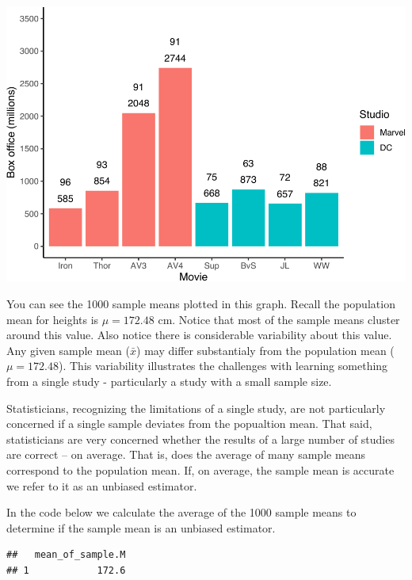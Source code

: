 \documentclass[
]{krantz}
\makeatletter
\newenvironment{Shaded}{\begin{snugshade}}{\end{snugshade}}
\newcommand{\DataTypeTok}[1]{\textcolor[rgb]{0.27,0.27,0.27}{#1}}
\newcommand{\KeywordTok}[1]{\textcolor[rgb]{0.27,0.27,0.27}{\textbf{#1}}}
\newcommand{\NormalTok}[1]{#1}
\newcommand{\OperatorTok}[1]{\textcolor[rgb]{0.43,0.43,0.43}{\textbf{#1}}}
\newcommand{\StringTok}[1]{\textcolor[rgb]{0.5,0.5,0.5}{#1}}
\newenvironment{kframe}{%
\medskip{}
\setlength{\fboxsep}{.8em}
 \def\at@end@of@kframe{}%
 \ifinner\ifhmode%
  \def\at@end@of@kframe{\end{minipage}}%
  \begin{minipage}{\columnwidth}%
 \fi\fi%
 \def\FrameCommand##1{\hskip\@totalleftmargin \hskip-\fboxsep
 \colorbox{shadecolor}{##1}\hskip-\fboxsep
     \hskip-\linewidth \hskip-\@totalleftmargin \hskip\columnwidth}%
 \MakeFramed {\advance\hsize-\width
   \@totalleftmargin\z@ \linewidth\hsize
   \@setminipage}}%
 {\par\unskip\endMakeFramed%
 \at@end@of@kframe}
\renewenvironment{Shaded}{\begin{kframe}}{\end{kframe}}
\makeatother
\begin{document}
\includegraphics{bookdown_files/figure-latex/unnamed-chunk-211-1.pdf}

You can see the 1000 sample means plotted in this graph. Recall the population mean for heights is \(\mu = 172.48\) cm. Notice that most of the sample means cluster around this value. Also notice there is considerable variability about this value. Any given sample mean (\(\bar{x}\)) may differ substantialy from the population mean (\(\mu = 172.48\)). This variability illustrates the challenges with learning something from a single study - particularly a study with a small sample size.

Statisticians, recognizing the limitations of a single study, are not particularly concerned if a single sample deviates from the popualtion mean. That said, statisticians are very concerned whether the results of a large number of studies are correct -- on average. That is, does the average of many sample means correspond to the population mean. If, on average, the sample mean is accurate we refer to it as an unbiased estimator.

In the code below we calculate the average of the 1000 sample means to determine if the sample mean is an unbiased estimator.

\begin{Shaded}
\end{Shaded}

\begin{verbatim}
##   mean_of_sample.M
## 1            172.6
\end{verbatim}
\end{document}
